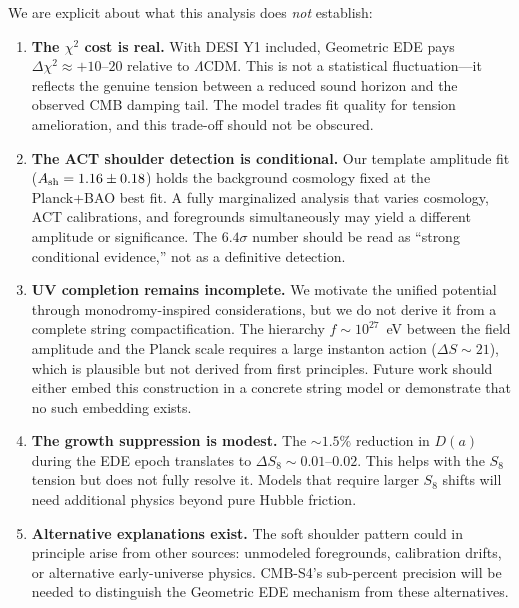 \documentclass[a4paper,11pt]{article}
\begin{document}
We are explicit about what this analysis does \emph{not} establish:

\begin{enumerate}
    \item \textbf{The $\chi^2$ cost is real.} With DESI Y1 included, Geometric EDE pays $\Delta\chi^2 \approx +10$--$20$ relative to $\Lambda$CDM. This is not a statistical fluctuation---it reflects the genuine tension between a reduced sound horizon and the observed CMB damping tail. The model trades fit quality for tension amelioration, and this trade-off should not be obscured.
    
    \item \textbf{The ACT shoulder detection is conditional.} Our template amplitude fit ($A_{\rm sh} = 1.16 \pm 0.18$) holds the background cosmology fixed at the Planck+BAO best fit. A fully marginalized analysis that varies cosmology, ACT calibrations, and foregrounds simultaneously may yield a different amplitude or significance. The $6.4\sigma$ number should be read as ``strong conditional evidence,'' not as a definitive detection.
    
    \item \textbf{UV completion remains incomplete.} We motivate the unified potential through monodromy-inspired considerations, but we do not derive it from a complete string compactification. The hierarchy $f \sim 10^{27}$~eV between the field amplitude and the Planck scale requires a large instanton action ($\Delta S \sim 21$), which is plausible but not derived from first principles. Future work should either embed this construction in a concrete string model or demonstrate that no such embedding exists.
    
    \item \textbf{The growth suppression is modest.} The $\sim 1.5\%$ reduction in $D(a)$ during the EDE epoch translates to $\Delta S_8 \sim 0.01$--$0.02$. This helps with the $S_8$ tension but does not fully resolve it. Models that require larger $S_8$ shifts will need additional physics beyond pure Hubble friction.
    
    \item \textbf{Alternative explanations exist.} The soft shoulder pattern could in principle arise from other sources: unmodeled foregrounds, calibration drifts, or alternative early-universe physics. CMB-S4's sub-percent precision will be needed to distinguish the Geometric EDE mechanism from these alternatives.
\end{enumerate}
\end{document}
